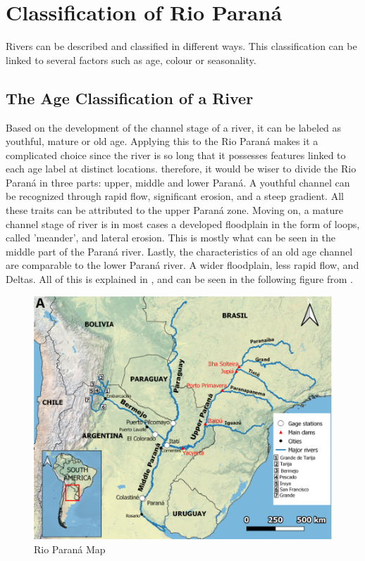 \section{Classification of Rio Paraná}

Rivers can be described and classified in different ways. This classification can be linked to several factors such as age, colour or seasonality. 

\subsection{The Age Classification of a River}
Based on the development of the channel stage of a river, it can be labeled as youthful, mature or old age.  \autocite{davisGeographicalCycle1899}
Applying this to the Rio Paraná makes it a complicated choice since the river is so long that it possesses features linked to each age label at distinct locations. therefore, it would be wiser to divide the Rio Paraná in three parts: upper, middle and lower Paraná. A youthful channel can be recognized through rapid flow, significant erosion, and a steep gradient. All these traits can be attributed to the upper Paraná zone.
Moving on, a mature channel stage of river is in most cases a developed floodplain in the form of loops, called 'meander', and lateral erosion. This is mostly what can be seen in the middle part of the Paraná river.
Lastly, the characteristics of an old age channel are comparable to the lower Paraná river. A wider floodplain, less rapid flow, and Deltas. All of this is explained in \autocite{orfeoParanaRiverArgentine2023}, and can be seen in the following figure from \autocite{lopezweibelSourcesTemporalDynamics2022}.



\begin{figure}[H]
    \centering    \includegraphics[width=0.5\linewidth]{figures/figure chap 2/map rio parana.png}
    \caption{Rio Paraná Map}
    \label{fig:placeholder}
\end{figure}


